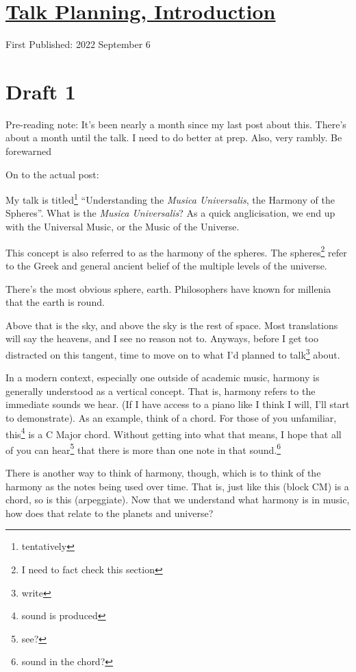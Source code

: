 \documentclass[12pt]{article}[titlepage]
\newcommand{\say}[1]{``#1''}
\newcommand{\1}{\={a}}
\newcommand{\2}{\={e}}
\newcommand{\3}{\={\i}}
\newcommand{\4}{\=o}
\newcommand{\5}{\=u}
\newcommand{\6}{\={A}}
\renewcommand{\,}{\textsuperscript{,}}
\begin{document}
\doublespacing
\section{\href{talk-planning-3.html}{Talk Planning, Introduction}}
First Published: 2022 September 6
\section{Draft 1}
Pre-reading note: It's been nearly a month since my last post about this.
There's about a month until the talk.
I need to do better at prep.
Also, very rambly.
Be forewarned

On to the actual post:

My talk is titled\footnote{tentatively} \say{Understanding the \textit{Musica Universalis}, the Harmony of the Spheres}.
What is the \textit{Musica Universalis}?
As a quick anglicisation, we end up with the Universal Music, or the Music of the Universe.

This concept is also referred to as the harmony of the spheres.
The spheres\footnote{I need to fact check this section} refer to the Greek and general ancient belief of the multiple levels of the universe.

There's the most obvious sphere, earth.
Philosophers have known for millenia that the earth is round.

Above that is the sky, and above the sky is the rest of space.
Most translations will say the heavens, and I see no reason not to.
Anyways, before I get too distracted on this tangent, time to move on to what I'd planned to talk\footnote{write} about.

In a modern context, especially one outside of academic music, harmony is generally understood as a vertical concept.
That is, harmony refers to the immediate sounds we hear.
(If I have access to a piano like I think I will, I'll start to demonstrate).
As an example, think of a chord.
For those of you unfamiliar, this\footnote{sound is produced} is a C Major chord.
Without getting into what that means, I hope that all of you can hear\footnote{see?} that there is more than one note in that sound.\footnote{sound in the chord?}

There is another way to think of harmony, though, which is to think of the harmony as the notes being used over time.
That is, just like this (block CM) is a chord, so is this (arpeggiate).
Now that we understand what harmony is in music, how does that relate to the planets and universe?
\end{document}
